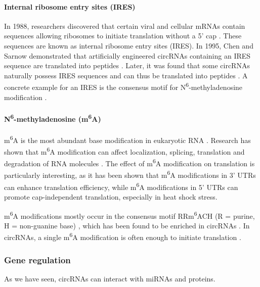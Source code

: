 \paragraph{Internal ribosome entry sites (IRES)}
In 1988, researchers discovered that certain viral and cellular mRNAs contain
sequences allowing ribosomes to initiate translation without a 5' cap
\supercite{pelletier_internal_1988, jang_segment_1988}. These sequences are
known as internal ribosome entry sites (IRES). In 1995, Chen and Sarnow
demonstrated that artificially engineered circRNAs containing an IRES sequence
are translated into peptides \supercite{chen_initiation_1995}. Later, it
was found that some circRNAs naturally possess IRES sequences and can thus be
translated into peptides
\supercite{chen_expanding_2020,legnini_circ-znf609_2017,pamudurti_translation_2017}.
A concrete example for an IRES is the consensus motif for
N\textsuperscript{6}-methyladenosine modification \supercite{yang_extensive_2017}.

\paragraph{N\textsuperscript{6}-methyladenosine (m\textsuperscript{6}A)}
m\textsuperscript{6}A is the most abundant base modification in eukaryotic RNA
\supercite{yang_extensive_2017,li_pivotal_2014,wei_methylated_1975}. Research
has shown that m\textsuperscript{6}A modification can affect localization,
splicing, translation and degradation of RNA molecules
\supercite{yue_rna_2015,meyer_dynamic_2014}. The effect of m\textsuperscript{6}A
modification on translation is particularly interesting, as it has been shown
that m\textsuperscript{6}A modifications in 3' UTRs can enhance translation
efficiency\supercite{wang_n6-methyladenosine_2015}, while m\textsuperscript{6}A
modifications in 5' UTRs can promote cap-independent translation, especially in
heat shock stress\supercite{zhou_dynamic_2015,meyer_5_2015}.

m\textsuperscript{6}A modifications mostly occur in the consensus motif
RRm\textsuperscript{6}ACH (R = purine, H = non-guanine base)
\supercite{csepany_sequence_1990,harper_sequence_1990}, which has been found to
be enriched in circRNAs \supercite{yang_extensive_2017}. In circRNAs, a single
m\textsuperscript{6}A modification is often enough to initiate translation
\supercite{yang_extensive_2017}.

\subsubsection{Gene regulation}
As we have seen, circRNAs can interact with miRNAs and proteins.

